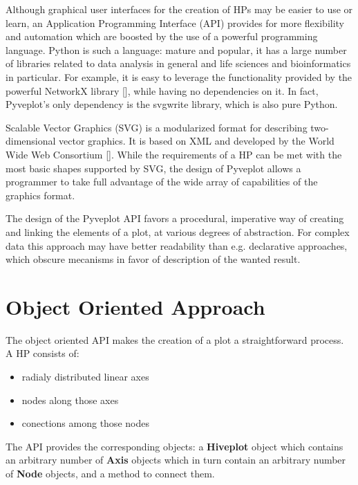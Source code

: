\documentclass{bioinfo}
\begin{document}



Although graphical user interfaces for the creation of HPs may be
easier to use or learn, an Application Programming Interface (API)
provides for more flexibility and automation which are boosted by the
use of a powerful programming language. Python is such a language:
mature and popular, it has a large number of libraries related to data
analysis in general and life sciences and bioinformatics in
particular. For example, it is easy to leverage the functionality
provided by the powerful NetworkX library
[\cite{hagberg-2008-exploring}], while having no dependencies on it.
In fact, Pyveplot's only dependency is the svgwrite library, which is
also pure Python.

Scalable Vector Graphics (SVG) is a modularized format for describing
two-dimensional vector graphics. It is based on XML and developed by
the World Wide Web Consortium [\cite{McCormack:11:SVG}]. While the
requirements of a HP can be met with the most basic shapes supported
by SVG, the design of Pyveplot allows a programmer to take full
advantage of the wide array of capabilities of the graphics format.

The design of the Pyveplot API favors a procedural, imperative way of
creating and linking the elements of a plot, at various degrees of
abstraction. For complex data this approach may have better
readability than e.g. declarative approaches, which obscure mecanisms in
favor of description of the wanted result.

\section{Object Oriented Approach}

The object oriented API makes the creation of a plot a straightforward
process. A HP consists of:
\begin{itemize}
\item radialy distributed linear axes
\item nodes along those axes
\item conections among those nodes
\end{itemize}
The API provides the corresponding objects: a {\bfseries Hiveplot} object
which contains an arbitrary number of {\bfseries Axis} objects which in
turn contain an arbitrary number of {\bfseries Node} objects, and a method
to connect them.
\end{document}
